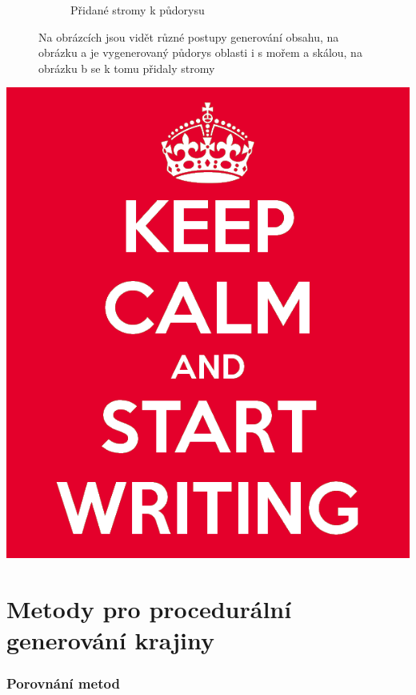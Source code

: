 \begin{figure}[h]
\begin{subfigure}{0.475\textwidth}
		\caption{Přidané stromy k půdorysu}
	\end{subfigure}
	\caption{Na obrázcích jsou vidět různé postupy generování obsahu, na obrázku a je vygenerovaný půdorys oblasti i s mořem a skálou, na obrázku b se k tomu přidaly stromy}
\end{figure}


\includegraphics[scale=0.3]{obrazky-figures/keep-calm.png}

\section{Metody pro procedurální generování krajiny}
\subsubsection{Porovnání metod}
\textcolor{gray}{\blindtext[8]}

